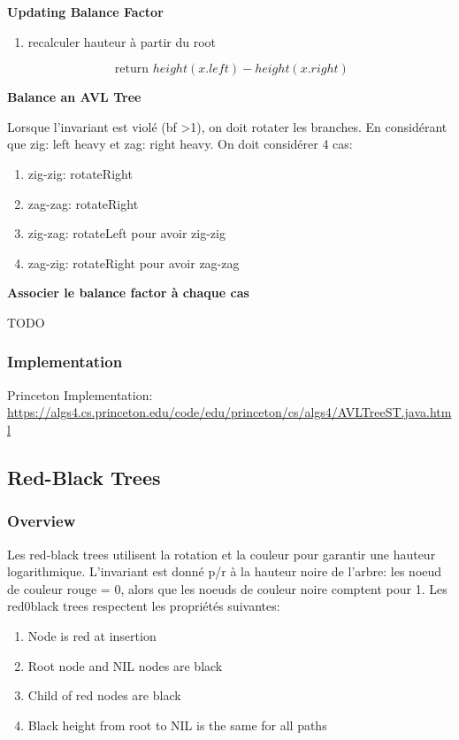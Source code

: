 \documentclass{article}
\begin{document}
\textbf{Updating Balance Factor}

\begin{enumerate}
    \item recalculer hauteur à partir du root
\end{enumerate}

\begin{remark}
    $$ \text{ return } height(x.left) - height(x.right) $$
\end{remark}

\textbf{Balance an AVL Tree}

Lorsque l'invariant est violé (bf >1), on doit rotater les branches. En
considérant que zig: left heavy et zag: right heavy. On
doit considérer 4 cas:
\begin{enumerate}
    \item zig-zig: rotateRight
    \item zag-zag: rotateRight
    \item zig-zag: rotateLeft pour avoir zig-zig
    \item zag-zig: rotateRight pour avoir zag-zag
\end{enumerate}

\textbf{Associer le balance factor à chaque cas}

TODO

\subsubsection{Implementation}%
\label{ssub:Implementation}

Princeton Implementation:
\url{https://algs4.cs.princeton.edu/code/edu/princeton/cs/algs4/AVLTreeST.java.html}

\subsection{Red-Black Trees}

\subsubsection{Overview}%
\label{ssub:Overview}

Les red-black trees utilisent la rotation et la couleur pour garantir
une hauteur logarithmique. L'invariant est donné p/r à la hauteur noire
de l'arbre: les noeud de couleur rouge = 0, alors que les noeuds de
couleur noire comptent pour 1. Les red0black trees respectent les propriétés
suivantes:
\begin{enumerate}
    \item Node is red at insertion
    \item Root node and NIL nodes are black
    \item Child of red nodes are black
    \item Black height from root to NIL is the same for all paths
\end{enumerate}
\end{document}
